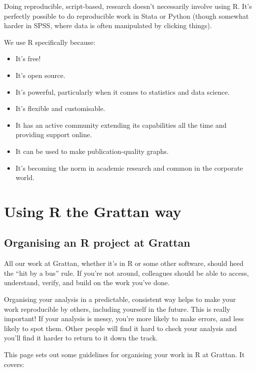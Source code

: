 \documentclass[]{book}
\providecommand{\tightlist}{%
  \setlength{\itemsep}{0pt}\setlength{\parskip}{0pt}}
\begin{document}
Doing reproducible, script-based, research doesn't necessarily involve using R. It's perfectly possible to do reproducible work in Stata or Python (though somewhat harder in SPSS, where data is often manipulated by clicking things).

We use R specifically because:

\begin{itemize}
\tightlist
\item
  It's free!
\item
  It's open source.
\item
  It's powerful, particularly when it comes to statistics and data science.
\item
  It's flexible and customisable.
\item
  It has an active community extending its capabilities all the time and providing support online.
\item
  It can be used to make publication-quality graphs.
\item
  It's becoming the norm in academic research and common in the corporate world.
\end{itemize}

\hypertarget{part-using-r-the-grattan-way}{%
\part{Using R the Grattan way}\label{part-using-r-the-grattan-way}}

\hypertarget{organising-projects}{%
\chapter{Organising an R project at Grattan}\label{organising-projects}}

All our work at Grattan, whether it's in R or some other software, should heed the ``hit by a bus'' rule. If you're not around, colleagues should be able to access, understand, verify, and build on the work you've done.

Organising your analysis in a predictable, consistent way helps to make your work reproducible by others, including yourself in the future. This is really important! If your analysis is messy, you're more likely to make errors, and less likely to spot them. Other people will find it hard to check your analysis and you'll find it harder to return to it down the track.

This page sets out some guidelines for organising your work in R at Grattan. It covers:
\end{document}
